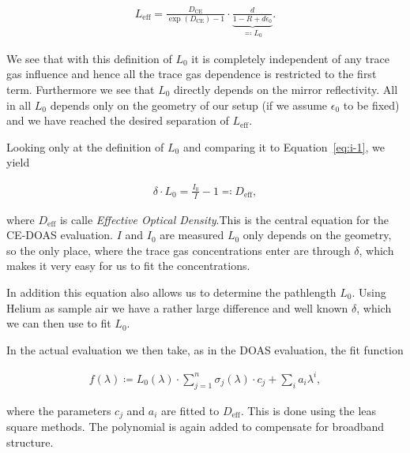 \begin{align}
  L_{\text{eff}} = \frac{D_{\text{CE}}}{\exp(D_{\text{CE}}) - 1} \cdot
  \underbrace{\frac{d}{1 - R + d\epsilon_0}}_{\eqqcolon L_0}.
\end{align}

We see that with this definition of $L_0$ it is completely independent
of any trace gas influence and hence all the trace gas dependence is
restricted to the first term. Furthermore we see that $L_0$ directly
depends on the mirror reflectivity. All in all $L_0$ depends only on
the geometry of our setup (if we assume $\epsilon_0$ to be fixed) and
we have reached the desired separation of $L_{\text{eff}}$.

Looking only at the definition of $L_0$ and comparing it to
Equation~\eqref{eq:i-1}, we yield

\begin{align}
  \delta \cdot L_0 = \frac{I_0}{I} - 1 \eqqcolon D_{\text{eff}}, \label{eq:ce-central}
\end{align}

where $D_{\text{eff}}$ is calle \emph{Effective Optical Density}.This
is the central equation for the CE-DOAS evaluation. $I$ and $I_0$ are
measured $L_0$ only depends on the geometry, so the only place, where
the trace gas concentrations enter are through $\delta$, which makes
it very easy for us to fit the concentrations.

In addition this equation also allows us to determine the pathlength
$L_0$. Using Helium as sample air we have a rather large difference
and well known $\delta$, which we can then use to fit
$L_0$.

In the actual evaluation we then take, as in the DOAS evaluation, the fit function

\begin{align*}
  f(\lambda) \coloneqq L_0(\lambda)\cdot\sum_{j=1}^n \sigma_j(\lambda)
  \cdot c_j + \sum_i a_i \lambda^i,
\end{align*}

where the parameters $c_j$ and $a_i$ are fitted to
$D_{\text{eff}}$. This is done using the leas square methods. The
polynomial is again added to compensate for broadband structure.

